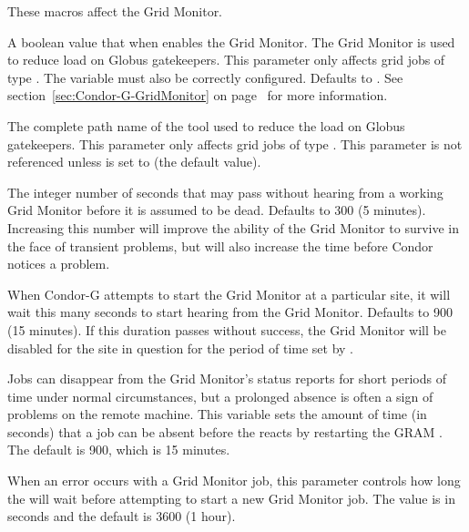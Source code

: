 These macros affect the Grid Monitor.
\begin{description}

\label{param:EnableGridMonitor}
\item[\Macro{ENABLE\_GRID\_MONITOR}]
  A boolean value that when  enables the Grid Monitor.
  The Grid Monitor is used to reduce load on Globus gatekeepers.
  This parameter only affects grid jobs of type .
  The variable  must also be correctly configured.
  Defaults to .
  See section~\ref{sec:Condor-G-GridMonitor} on
  page~\pageref{sec:Condor-G-GridMonitor}
  for more information.

\label{param:GridMonitor}
\item[\Macro{GRID\_MONITOR}]
  The complete path name of the  tool used to reduce
  the load on Globus gatekeepers.
  This parameter only affects grid jobs of type .
  This parameter is not referenced unless
   is set to  (the default value). 

\label{param:GridMonitorHeartbeatTimeout}
\item[\Macro{GRID\_MONITOR\_HEARTBEAT\_TIMEOUT}]
  The integer number of seconds that may pass without hearing from a 
  working Grid Monitor before it is assumed to be dead.
  Defaults to 300 (5 minutes).  Increasing this number
  will improve the ability of the Grid Monitor to survive in the face of
  transient problems,
  but will also increase the time before Condor notices a problem.

\label{param:GridMonitorRetryDuration}
\item[\Macro{GRID\_MONITOR\_RETRY\_DURATION}]
  When Condor-G attempts to start the Grid Monitor at a particular
  site, it will wait this many seconds to start hearing from the
  Grid Monitor. Defaults to 900 (15 minutes).  If this duration
  passes without success, the Grid Monitor will be disabled for the
  site in question for the period of time set by
  .

\label{param:GridMonitorNoStatusTimeout}
\item[\Macro{GRID\_MONITOR\_NO\_STATUS\_TIMEOUT}]
  Jobs can disappear from the Grid Monitor's status reports for
  short periods of time under normal circumstances, but a prolonged
  absence is often a sign of problems on the remote machine. This variable
  sets the amount of time (in seconds) that a job can be absent before the
   reacts by restarting the GRAM .
  The default is 900, which is 15 minutes.

\label{param:GridMonitorDisableTime}
\item[\Macro{GRID\_MONITOR\_DISABLE\_TIME}]
  When an error occurs with a Grid Monitor job, this parameter controls
  how long the  will wait before attempting to
  start a new Grid Monitor job. The value is in seconds and the default
  is 3600 (1 hour).

\end{description}


